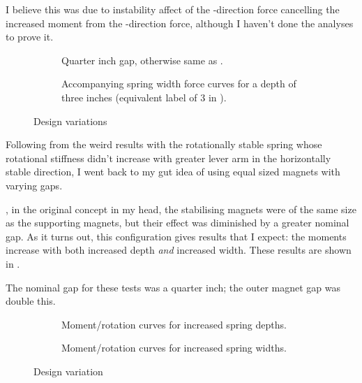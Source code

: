 I believe this was due to instability affect of the \y-direction
force cancelling the increased moment from the \z-direction force,
although I haven't done the analyses to prove it.

\begin{figure}
  \begin{subfigure} 
  \caption{Quarter inch gap, otherwise same as .}
\end{subfigure}
 \begin{subfigure} 
  \caption{Accompanying spring width force curves for a depth of three inches (equivalent label of 3 in ).}
\end{subfigure}
\caption{Design variations }
\end{figure}

Following from the weird results with the rotationally stable spring
whose rotational stiffness didn't increase with greater lever arm in
the horizontally stable direction, I went back to my gut idea of using
equal sized magnets with varying gaps.

\Ie, in the original concept in my head, the stabilising magnets were
of the same size as the supporting magnets, but their effect was
diminished by a greater nominal gap. As it turns out, this
configuration gives results that I expect: the moments increase with
both increased depth \emph{and} increased width. These results are
shown in .

The nominal gap for these tests was a quarter inch; the outer magnet
gap was double this.

\begin{figure}
  \begin{subfigure} 
  \caption{Moment/rotation curves for increased spring depths.}
\end{subfigure}
\begin{subfigure}
  \caption{Moment/rotation curves for increased spring widths.}
\end{subfigure}
\caption{Design variation }
\end{figure}


